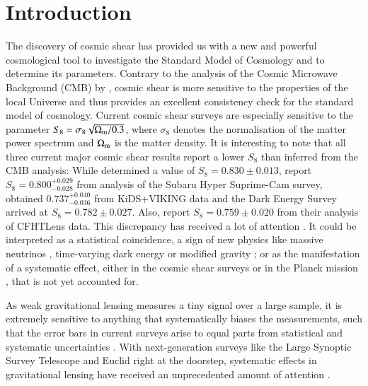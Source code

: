 \section{Introduction}
The discovery of cosmic shear has provided us with a new and powerful cosmological tool to investigate the Standard Model of Cosmology and to determine its parameters. Contrary to the analysis of the Cosmic Microwave Background (CMB) by \citet{2018arXiv180706209P}, cosmic shear is more sensitive to the properties of the local Universe and thus provides an excellent consistency check for the standard model of cosmology. Current cosmic shear surveys are especially sensitive to the parameter $S_8=\sigma_8 \sqrt{\Omega_{\rm m}/0.3}$, where $\sigma_8$ denotes the normalisation of the matter power spectrum and $\Omega_{\rm m}$ is the matter density.
It is interesting to note that all three current major cosmic shear results report a lower $S_8$ than inferred from the CMB analysis: While \citet{2018arXiv180706209P} determined a value of $S_8 = 0.830 \pm 0.013$, \citet{2018arXiv180909148H} report $S_8 = 0.800^{+0.029}_{-0.028}$ from analysis of the Subaru Hyper Suprime-Cam survey, \citet[][hereafter H18]{2018arXiv181206076H} obtained $0.737_{-0.036}^{+0.040}$ from KiDS+VIKING data and the Dark Energy Survey \citep{2018PhRvD..98d3528T} arrived at $S_8=0.782\pm 0.027$. Also, \citet{2013MNRAS.432.2433H} report $S_8 = 0.759 \pm 0.020$ from their analysis of CFHTLens data. This discrepancy has received a lot of attention \citep{2013PDU.....2..166V}. It could be interpreted as a statistical coincidence, a sign of new physics like massive neutrinos \citep{2014PhRvL.112e1303B}, time-varying dark energy or modified gravity \citep{2016A&A...594A..14P}; or as the manifestation of a systematic effect, either in the cosmic shear surveys or in the Planck mission \citep{2016ApJ...818..132A}, that is not yet accounted for. 

As weak gravitational lensing measures a tiny signal over a large sample, it is extremely sensitive to anything that systematically biases the measurements, such that the error bars in current surveys arise to equal parts from statistical and systematic uncertainties \citep[compare][]{2017MNRAS.465.1454H}. With next-generation surveys like the Large Synoptic Survey Telescope and Euclid right at the doorstep, systematic effects in gravitational lensing have received an unprecedented amount of attention \citep{2018arXiv181002353A,2019arXiv190207439B,2019arXiv190109488S}. %

